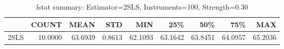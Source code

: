\begin{table}[ht]
\centering
\caption{fstat summary: Estimator=2SLS, Instruments=100, Strength=0.30}
\begin{tabular}{lrrrrrrrr}
\toprule
 & COUNT & MEAN & STD & MIN & 25\% & 50\% & 75\% & MAX \\
\midrule
2SLS & 10.0000 & 63.6939 & 0.8613 & 62.1093 & 63.1642 & 63.8451 & 64.0957 & 65.2036 \\
\bottomrule
\end{tabular}
\end{table}

